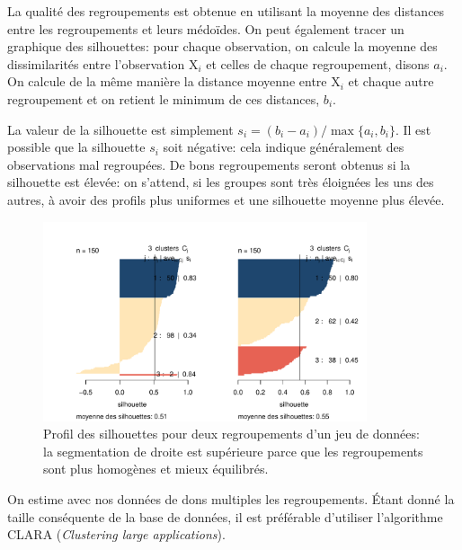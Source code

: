 \documentclass[
  11pt,
  letterpaper,
]{scrbook}
\theoremstyle{definition}
\theoremstyle{remark}
\begin{document}
La qualité des regroupements est obtenue en utilisant la moyenne des
distances entre les regroupements et leurs médoïdes. On peut également
tracer un graphique des silhouettes: pour chaque observation, on calcule
la moyenne des dissimilarités entre l'observation \(\mathrm{X}_i\) et
celles de chaque regroupement, disons \(a_i\). On calcule de la même
manière la distance moyenne entre \(\mathrm{X}_i\) et chaque autre
regroupement et on retient le minimum de ces distances, \(b_i\).

La valeur de la silhouette est simplement
\(s_i=(b_i-a_i)/\max\{a_i, b_i\}\). Il est possible que la silhouette
\(s_i\) soit négative: cela indique généralement des observations mal
regroupées. De bons regroupements seront obtenus si la silhouette est
élevée: on s'attend, si les groupes sont très éloignées les uns des
autres, à avoir des profils plus uniformes et une silhouette moyenne
plus élevée.

\begin{figure}[ht!]

{\centering \includegraphics[width=0.85\textwidth,height=\textheight]{regroupements_files/figure-pdf/fig-silhouette-1.pdf}

}

\caption{\label{fig-silhouette}Profil des silhouettes pour deux
regroupements d'un jeu de données: la segmentation de droite est
supérieure parce que les regroupements sont plus homogènes et mieux
équilibrés.}

\end{figure}

On estime avec nos données de dons multiples les regroupements. Étant
donné la taille conséquente de la base de données, il est préférable
d'utiliser l'algorithme CLARA (\emph{Clustering large applications}).
\end{document}
